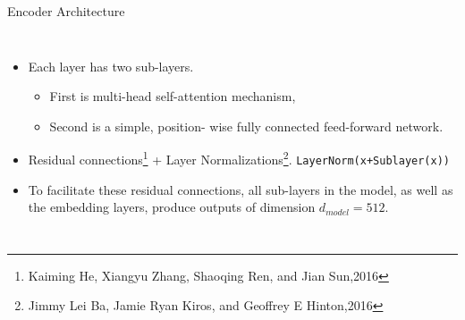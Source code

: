 \documentclass{beamer}
\begin{document}
\begin{frame}{Encoder Architecture}
\begin{columns}
\begin{itemize}
    \item Each layer has two sub-layers. 
        \begin{itemize}
            \item  First is multi-head self-attention mechanism, 
            \item Second is a simple, position- wise fully connected feed-forward network.
        \end{itemize}
    \item Residual connections\footnote{Kaiming He, Xiangyu Zhang, Shaoqing Ren, and Jian Sun,2016} + Layer Normalizations\footnote{Jimmy Lei Ba, Jamie Ryan Kiros, and Geoffrey E Hinton,2016}.
    \texttt{LayerNorm(x+Sublayer(x))}
    \item To facilitate these residual connections, all sub-layers in the model, as well as the embedding layers, produce outputs of dimension $d_{model} = 512.$
\end{itemize}  
\end{columns}  
\end{frame}
\end{document}
